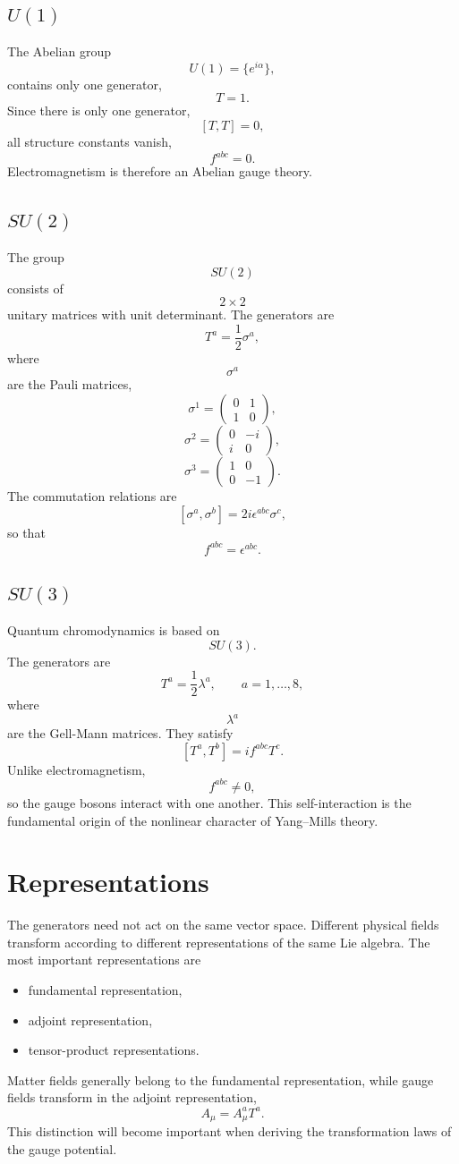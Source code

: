 \subsection{$U(1)$}
The Abelian group
\[U(1)=\{e^{i\alpha}\},\]
contains only one generator,
\[T=1.\]
Since there is only one generator,
\[[T,T]=0,\]
all structure constants vanish,
\[f^{abc}=0.\]
Electromagnetism is therefore an Abelian gauge theory.
\subsection{$SU(2)$}
The group
\[SU(2)\]
consists of
\[2\times2\]
unitary matrices with unit determinant.
The generators are
\[T^a=\frac12\sigma^a,\]
where
\[\sigma^a\]
are the Pauli matrices,
\[\sigma^1=\begin{pmatrix}0&1\\1&0\end{pmatrix},\]
\[\sigma^2=\begin{pmatrix}0&-i\\i&0\end{pmatrix},\]
\[\sigma^3=\begin{pmatrix}1&0\\0&-1\end{pmatrix}.\]
The commutation relations are
\[[\sigma^a,\sigma^b]=2i\epsilon^{abc}\sigma^c,\]
so that
\[f^{abc}=\epsilon^{abc}.\]
\subsection{$SU(3)$}
Quantum chromodynamics is based on
\[SU(3).\]
The generators are
\[T^a=\frac12\lambda^a,\qquad a=1,\ldots,8,\]
where
\[\lambda^a\]
are the Gell-Mann matrices.
They satisfy
\[[T^a,T^b]=if^{abc}T^c.\]
Unlike electromagnetism,
\[f^{abc}\neq0,\]
so the gauge bosons interact with one another.
This self-interaction is the fundamental origin of the nonlinear
character of Yang--Mills theory.
\section{Representations}
The generators need not act on the same vector space.
Different physical fields transform according to different
representations of the same Lie algebra.
The most important representations are
\begin{itemize}
\item fundamental representation,
\item adjoint representation,
\item tensor-product representations.
\end{itemize}
Matter fields generally belong to the fundamental representation,
while gauge fields transform in the adjoint representation,
\[A_\mu=A_\mu^aT^a.\]
This distinction will become important when deriving the transformation
laws of the gauge potential.
